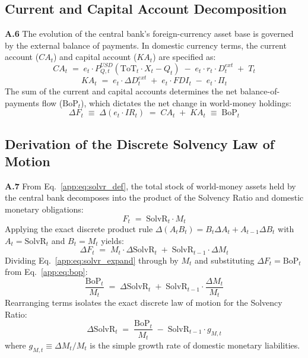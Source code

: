 \subsection{Current and Capital Account Decomposition}
\label{app:current_account}

\textbf{A.6} The evolution of the central bank's foreign-currency asset base is governed by the external balance of payments. In domestic currency terms, the current account ($CA_t$) and capital account ($KA_t$) are specified as:
\begin{equation}
	\label{app:eq:CA}
	CA_t \;=\; e_t \cdot P_{Q,t}^{USD}\!\left(\text{ToT}_t \cdot X_t - Q_t\right) \;-\; e_t \cdot r_t \cdot D_t^{ext} \;+\; T_t
\end{equation}
\begin{equation}
	\label{app:eq:KA}
	KA_t \;=\; e_t \cdot \Delta D_t^{ext} \;+\; e_t \cdot FDI_t \;-\; e_t \cdot \Pi_t
\end{equation}
The sum of the current and capital accounts determines the net balance-of-payments flow ($\text{BoP}_t$), which dictates the net change in world-money holdings:
\begin{equation}
	\label{app:eq:bop}
	\Delta F_t \;\equiv\; \Delta(e_t \cdot IR_t) \;=\; CA_t \;+\; KA_t \;\equiv\; \text{BoP}_t
\end{equation}

\subsection{Derivation of the Discrete Solvency Law of Motion}
\label{app:solvr_substitution}

\textbf{A.7} From Eq.~\eqref{app:eq:solvr_def}, the total stock of world-money assets held by the central bank decomposes into the product of the Solvency Ratio and domestic monetary obligations:
\begin{equation}
	\label{app:eq:solvr_sub}
	F_t \;=\; \text{SolvR}_t \cdot M_t
\end{equation}
Applying the exact discrete product rule $\Delta(A_t B_t) = B_t \Delta A_t + A_{t-1} \Delta B_t$ with $A_t = \text{SolvR}_t$ and $B_t = M_t$ yields:
\begin{equation}
	\label{app:eq:solvr_expand}
	\Delta F_t \;=\; M_t \cdot \Delta\text{SolvR}_t \;+\; \text{SolvR}_{t-1} \cdot \Delta M_t
\end{equation}
Dividing Eq.~\eqref{app:eq:solvr_expand} through by $M_t$ and substituting $\Delta F_t = \text{BoP}_t$ from Eq.~\eqref{app:eq:bop}:
\begin{equation}
	\frac{\text{BoP}_t}{M_t} \;=\; \Delta\text{SolvR}_t \;+\; \text{SolvR}_{t-1} \cdot \frac{\Delta M_t}{M_t}
\end{equation}
Rearranging terms isolates the exact discrete law of motion for the Solvency Ratio:
\begin{equation}
	\label{app:eq:solvr_lom}
	\boxed{\;\Delta\text{SolvR}_t \;=\; \frac{\text{BoP}_t}{M_t} \;-\; \text{SolvR}_{t-1} \cdot g_{M,t}\;}
\end{equation}
where $g_{M,t} \equiv \Delta M_t / M_t$ is the simple growth rate of domestic monetary liabilities.

